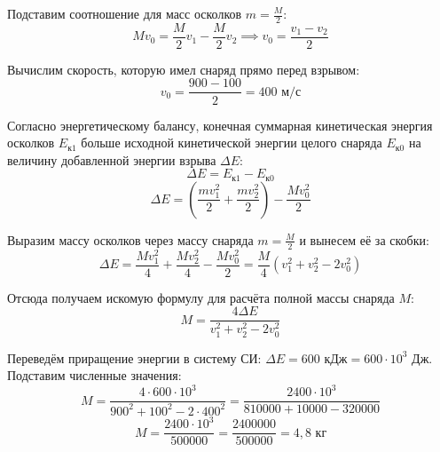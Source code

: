 \begin{taskadvanced}
\begin{solutionbox}
Подставим соотношение для масс осколков $m = \frac{M}{2}$:
$$M v_0 = \frac{M}{2} v_1 - \frac{M}{2} v_2 \implies v_0 = \frac{v_1 - v_2}{2}$$

Вычислим скорость, которую имел снаряд прямо перед взрывом:
$$v_0 = \frac{900 - 100}{2} = 400 \text{ м/с}$$

Согласно энергетическому балансу, конечная суммарная кинетическая энергия осколков $E_{\text{к1}}$ больше исходной кинетической энергии целого снаряда $E_{\text{к0}}$ на величину добавленной энергии взрыва $\Delta E$:
$$\Delta E = E_{\text{к1}} - E_{\text{к0}}$$
$$\Delta E = \left(\frac{m v_1^2}{2} + \frac{m v_2^2}{2}\right) - \frac{M v_0^2}{2}$$

Выразим массу осколков через массу снаряда $m = \frac{M}{2}$ и вынесем её за скобки:
$$\Delta E = \frac{M v_1^2}{4} + \frac{M v_2^2}{4} - \frac{M v_0^2}{2} = \frac{M}{4} (v_1^2 + v_2^2 - 2v_0^2)$$

Отсюда получаем искомую формулу для расчёта полной массы снаряда $M$:
$$M = \frac{4 \Delta E}{v_1^2 + v_2^2 - 2v_0^2}$$

Переведём приращение энергии в систему СИ: $\Delta E = 600 \text{ кДж} = 600 \cdot 10^3$ Дж. Подставим численные значения:
$$M = \frac{4 \cdot 600 \cdot 10^3}{900^2 + 100^2 - 2 \cdot 400^2} = \frac{2400 \cdot 10^3}{810000 + 10000 - 320000}$$
$$M = \frac{2400 \cdot 10^3}{500000} = \frac{2400000}{500000} = 4{,}8 \text{ кг}$$
\end{solutionbox}

\end{taskadvanced}